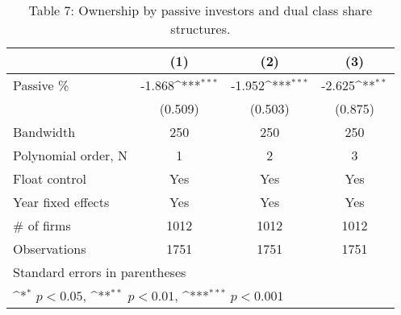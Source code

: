 \begin{table}[htbp]\centering
\def\sym#1{\ifmmode^{#1}\else\(^{#1}\)\fi}
\caption{Table 7: Ownership by passive investors and dual class share structures.}
\begin{tabular}{l*{3}{c}}
\hline\hline
                    &\multicolumn{1}{c}{(1)}         &\multicolumn{1}{c}{(2)}         &\multicolumn{1}{c}{(3)}         \\
\hline
Passive \%           &      -1.868\sym{***}&      -1.952\sym{***}&      -2.625\sym{**} \\
                    &     (0.509)         &     (0.503)         &     (0.875)         \\
\hline
Bandwidth           &         250         &         250         &         250         \\
Polynomial order, N &           1         &           2         &           3         \\
Float control       &         Yes         &         Yes         &         Yes         \\
Year fixed effects  &         Yes         &         Yes         &         Yes         \\
\# of firms          &        1012         &        1012         &        1012         \\
Observations        &        1751         &        1751         &        1751         \\
\hline\hline
\multicolumn{4}{l}{\footnotesize Standard errors in parentheses}\\
\multicolumn{4}{l}{\footnotesize \sym{*} \(p<0.05\), \sym{**} \(p<0.01\), \sym{***} \(p<0.001\)}\\
\end{tabular}
\end{table}

